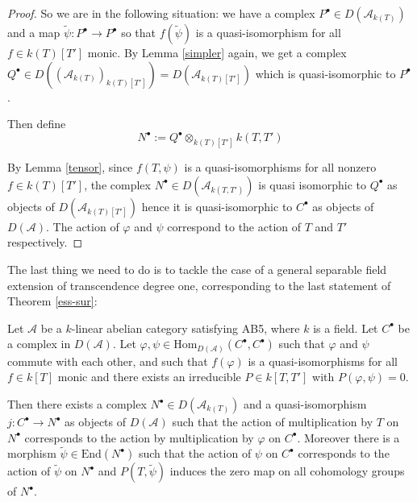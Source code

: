 \documentclass{amsart}
\begin{document}
\begin{proof}
So we are in the following situation: we have a complex $P^{\bullet}\in D(\mathcal{A}_{k(T)})$ and a map $\tilde{\psi}:P^{\bullet}{\rightarrow} P^{\bullet}$ so that $f(\tilde{\psi})$ is a quasi-isomorphism for all $f\in k(T)[T']$ monic. By Lemma \ref{simpler} again, we get a complex $Q^{\bullet}\in D((\mathcal{A}_{k(T)})_{k(T)[T']})=D(\mathcal{A}_{k(T)[T']})$ which is quasi-isomorphic to $P^{\bullet}$.

Then define
$$N^{\bullet}:=Q^{\bullet}\otimes_{k(T)[T']}k(T,T')$$

By Lemma \ref{tensor}, since $f(T,\psi)$ is a quasi-isomorphisms for all nonzero $f\in k(T)[T']$, the complex $N^{\bullet}\in D(\mathcal{A}_{k(T,T')})$ is quasi isomorphic to $Q^{\bullet}$ as objects of $D(\mathcal{A}_{k(T)[T']})$ hence it is quasi-isomorphic to $C^{\bullet}$ as objects of $D(\mathcal{A})$. The action of $\varphi$ and $\psi$ correspond to the action of $T$ and $T'$ respectively.
\end{proof}

The last thing we need to do is to tackle the case of a general separable field extension of transcendence degree one, corresponding to the last statement of Theorem \ref{ess-sur}:

\begin{lemma}\label{simpler3}
Let $\mathcal{A}$ be a $k$-linear abelian category satisfying AB5, where $k$ is a field. Let $C^\bullet$ be a complex in $D(\mathcal{A})$. Let $\varphi, \psi \in \mathrm{Hom}_{D(\mathcal{A})}(C^\bullet, C^\bullet)$ such that $\varphi$ and $\psi$ commute with each other, and such that $f(\varphi)$ is a quasi-isomorphisms for all $f\in k[T]$ monic and there exists an irreducible $P\in k[T,T']$ with $P(\varphi, \psi)=0$. 

Then there exists a complex $N^{\bullet}\in D(\mathcal{A}_{k(T)})$ and a quasi-isomorphism $j : C^\bullet \to N^\bullet$ as objects of $D(\mathcal{A})$ such that the action of multiplication by $T$ on $N^\bullet$ corresponds to the action by multiplication by $\varphi$ on $C^\bullet$. Moreover there is a morphism $\tilde{\psi}\in \mathrm{End}(N^{\bullet})$ such that the action of $\psi$ on $C^{\bullet}$ corresponds to the action of $\tilde{\psi}$ on $N^{\bullet}$ and $P(T,\tilde{\psi})$ induces the zero map on all cohomology groups of $N^{\bullet}$.
\end{lemma}
\end{document}
